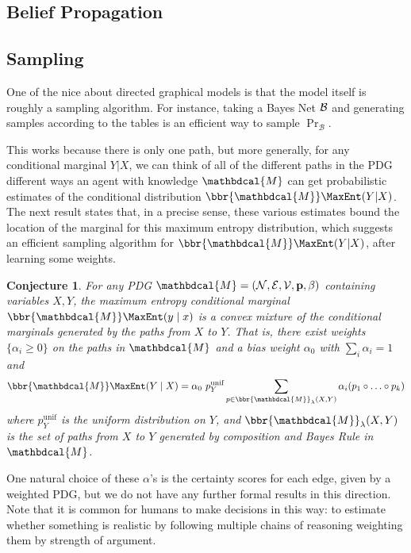 \documentclass{article}
\theoremstyle{plain}
\newtheorem{conj}[theorem]{Conjecture}
\theoremstyle{definition}
\theoremstyle{remark}
\newcommand\mat[1]{\mathbf{#1}}
\newcommand{\V}{\mathcal V}
\newcommand{\N}{\mathcal N}
\newcommand{\Ed}{\mathcal E}
\newcommand{\pdgvars}[1][]{(\N#1, \Ed#1, \V#1, \mat p#1, \beta#1)}
\newcommand{\dg}[1]{\mathbdcal{#1}}
\numberwithin{equation}{section}
\begin{document}
{\begin{vfull}
	\subsection{Belief Propagation}
	
	
	\subsection{Sampling}
	
	One of the nice about directed graphical models is that the model itself is roughly a sampling algorithm. For instance, taking a Bayes Net $\cal B$ and generating samples according to the tables is an efficient way to sample $\Pr_{\mathcal B}$.

	This works because there is only one path, but more generally, for any conditional marginal $Y|X$, we can think of all of the different paths in the PDG different ways an agent with knowledge $\dg M$ can get probabilistic estimates of the conditional distribution $\bbr{\dg M}\MaxEnt(Y | X)$. The next result states that, in a precise sense, these various estimates bound the location of the marginal for this maximum entropy distribution, which suggests an efficient sampling algorithm for $\bbr{\dg M}\MaxEnt(Y | X)$, after learning some weights.
	
	\begin{conj}\label{thm:maxent-hull}
		For any PDG $\dg M = \pdgvars[]$ containing variables $X, Y$, the maximum entropy conditional marginal $\bbr{\dg M}\MaxEnt(y \mid x)$ is a convex mixture of the conditional marginals generated by the paths from $X$ to $Y$.  That is, there exist weights $\{\alpha_i \geq 0\}$ on the paths in $\dg M$ and a bias weight $\alpha_0$ with $\sum_i {\alpha_i} = 1$ and
		\[ \bbr{\dg M}\MaxEnt(Y \mid X) = \alpha_0 \  p^{\text{unif}}_Y \sum_{p \in \bbr{\dg M}_\lambda(X, Y)} \alpha_i (p_1 \circ \ldots \circ p_k) \]
		where $p^{\text{unif}}_Y$ is the uniform distribution on $Y$, and $\bbr{\dg M}_\lambda(X,Y)$ is the set of paths from $X$ to $Y$ generated by composition and Bayes Rule in $\dg M$. 
	\end{conj}

	One natural choice of these $\alpha$'s is the certainty scores for each edge, given by a weighted PDG, but we do not have any further formal results in this direction.
	Note that it is common for humans to make decisions in this way: to estimate whether something is realistic by following multiple chains of reasoning weighting them by strength of argument.
	
	\end{vfull}
}
\end{document}
